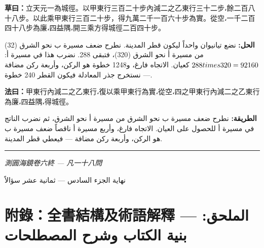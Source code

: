 \documentclass[11pt,a4paper]{article}
\newcommand{\ar}[1]{\arabicfont\beginR #1\endR}
\newcommand{\longline}{\noindent\rule{\textwidth}{0.4pt}}
\newcommand{\working}[2]{\par\noindent%
  \begin{minipage}[t]{0.48\textwidth}\textbf{草曰：}#1\end{minipage}%
  \hfill%
  \begin{minipage}[t]{0.48\textwidth}\arabicfont\beginR\textbf{الحل:} #2\endR\end{minipage}\par\vspace{0.2cm}}
\newcommand{\method}[2]{\par\noindent%
  \begin{minipage}[t]{0.48\textwidth}\textbf{法曰：}#1\end{minipage}%
  \hfill%
  \begin{minipage}[t]{0.48\textwidth}\arabicfont\beginR\textbf{الطريقة:} #2\endR\end{minipage}\par\vspace{0.3cm}}
\begin{document}
\working{立天元一為城徑。以甲東行三百二十步內減二之乙東行三十二步،餘二百八十八步。以此乘甲東行三百二十步，得九萬二千一百六十步為實。從空،一千二百四十八步為廉،四益隅،開三乘方得城徑二百四十步。}{نضع تيانيوان واحداً ليكون قطر المدينة. نطرح ضعف مسيرة ب نحو الشرق (32) من مسيرة أ نحو الشرق (320)، فتبقى 288. نضرب هذا في مسيرة أ: $288 \\times 320 = 92160$ كعيان. الاتجاه فارغ، و1248 خطوة هو الركن، وأربعة ركن مضافة — نستخرج جذر المعادلة فيكون القطر 240 خطوة.}

\method{甲東行內減二之乙東行،復以乘甲東行為實،從空،四之甲東行內減二之乙東行為廉،四益隅،得城徑。}{نطرح ضعف مسيرة ب نحو الشرق من مسيرة أ نحو الشرق، ثم نضرب الناتج في مسيرة أ للحصول على العيان. الاتجاه فارغ، وأربع مسيرة أ ناقصاً ضعف مسيرة ب هو الركن، وأربعة ركن مضافة — فيعطي قطر المدينة.}

\vspace{0.5cm}
\longline
\begin{center}
\textit{測圓海鏡卷六終 --- 凡一十八問}

\vspace{0.2cm}

{\arabicfont\beginR نهاية الجزء السادس — ثمانية عشر سؤالاً\endR}
\end{center}

\newpage

\section*{附錄：全書結構及術語解釋 — \ar{الملحق: بنية الكتاب وشرح المصطلحات}}
\end{document}
